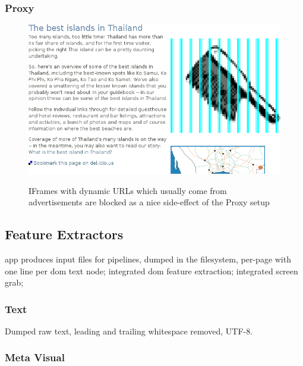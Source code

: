 \subsubsection{Proxy}

\begin{figure}
	{\includegraphics[width=\textwidth]{add}}
\caption{IFrames with dynamic URLs which usually come from advertisements are blocked as a nice side-effect of the Proxy setup}
\end{figure}

\subsection{Feature Extractors}

app produces input files for pipelines, dumped in the filesystem, per-page with one line per dom text node;
integrated dom feature extraction;
integrated screen grab;

\subsubsection{Text}

Dumped raw text, leading and trailing whitespace removed, UTF-8.

\subsubsection{Meta Visual}

